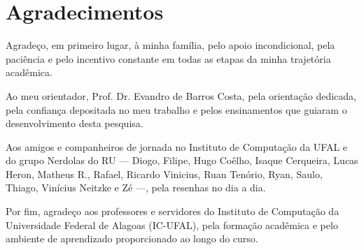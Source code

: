 \chapter*{Agradecimentos}

Agradeço, em primeiro lugar, à minha família, pelo apoio incondicional, pela paciência e pelo incentivo constante em todas as etapas da minha trajetória acadêmica.

Ao meu orientador, Prof. Dr. Evandro de Barros Costa, pela orientação dedicada, pela confiança depositada no meu trabalho e pelos ensinamentos que guiaram o desenvolvimento desta pesquisa.

Aos amigos e companheiros de jornada no Instituto de Computação da UFAL e do grupo Nerdolas do RU --- Diogo, Filipe, Hugo Coêlho, Isaque Cerqueira, Lucas Heron, Matheus R., Rafael, Ricardo Vinicius, Ruan Tenório, Ryan, Saulo, Thiago, Vinícius Neitzke e Zé ---, pela resenhas no dia a dia.

Por fim, agradeço aos professores e servidores do Instituto de Computação da Universidade Federal de Alagoas (IC-UFAL), pela formação acadêmica e pelo ambiente de aprendizado proporcionado ao longo do curso.
